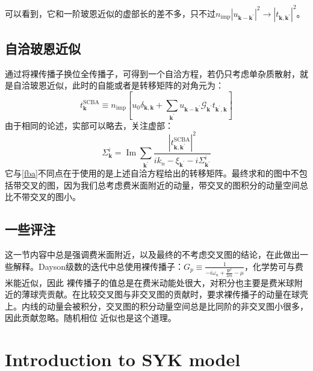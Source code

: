 \documentclass[10pt,openany]{book}
\theoremstyle{thmstyle} %
\theoremstyle{defstyle} %
\theoremstyle{prostyle} %
\begin{document}
可以看到，它和一阶玻恩近似的虚部长的差不多，只不过$ n_{\mathrm{imp}}\left|u_{\mathbf{k}-\mathbf{k}^{\prime}}\right|^2\to\left|t_{\mathbf{k}, \mathbf{k}^{\prime}}\right|^2 $。
\subsection*{自洽玻恩近似} 
通过将裸传播子换位全传播子，可得到一个自洽方程，若仍只考虑单杂质散射，就是自洽玻恩近似，此时的自能或者是转移矩阵的对角元为：
\begin{equation}
  t_{\mathbf{k}}^{\mathrm{SCBA}} \equiv n_{\mathrm{imp}}\left[u_0 \delta_{\mathbf{k}, \mathbf{k}}+\sum_{\mathbf{k}^{\prime}} u_{\mathbf{k}-\mathbf{k}^{\prime}} \mathcal{G}_{\mathbf{k}^{\prime}} t_{\mathbf{k}^{\prime}, \mathbf{k}}\right]
\end{equation}
由于相同的论述，实部可以略去，关注虚部：
\begin{equation}
  \Sigma_{\mathbf{k}}^i=\operatorname{Im} \sum_{\mathbf{k}^{\prime}} \frac{\left|t_{\mathbf{k}, \mathbf{k}^{\prime}}^{\mathrm{SCBA}}\right|^2}{i k_n-\xi_{\mathbf{k}^{\prime}}-i \Sigma_{\mathbf{k}^{\prime}}^i}
\end{equation}
它与\eqref{fba}不同点在于使用的是上述自洽方程给出的转移矩阵。最终求和的图中不包括带交叉的图，因为我们总考虑费米面附近的动量，带交叉的图积分的动量空间总比不带交叉的图小。
\subsection*{一些评注}
这一节内容中总是强调费米面附近，以及最终的不考虑交叉图的结论，在此做出一些解释。Dayson级数的迭代中总使用裸传播子：$ G_p \equiv \frac{1}{-i \omega_n+\frac{\mathbf{p}^2}{2 m}-\mu} $，化学势可与费米能近似，因此
裸传播子的值总是在费米动能处很大，对积分也主要是费米球附近的薄球壳贡献。在比较交叉图与非交叉图的贡献时，要求裸传播子的动量在球壳上。内线的动量会被积分，交叉图的积分动量空间总是比同阶的非交叉图小很多，因此贡献忽略。随机相位
近似也是这个道理。
\section{Introduction to SYK model}
\end{document}
